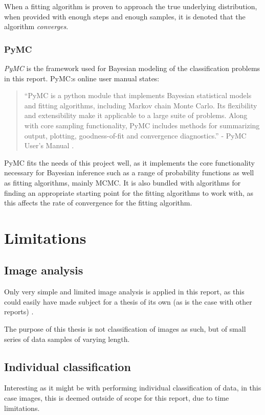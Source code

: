 When a fitting algorithm is proven to approach the true underlying 
distribution, when provided with enough steps and enough samples, it is 
denoted that the algorithm \emph{converges}. 

\subsubsection{PyMC}
\emph{PyMC} is the framework used for Bayesian modeling of the
classification problems in this report. PyMC:s online user manual
states:

\blockquote{
    ``PyMC is a python module that implements Bayesian statistical 
    models and fitting algorithms, including Markov chain Monte Carlo. 
    Its flexibility and extensibility make it applicable to a large 
    suite of problems. Along with core sampling functionality, 
    PyMC includes methods for summarizing output, plotting, 
    goodness-of-fit and convergence diagnostics.''
    - PyMC User's Manual \cite{pymc}.}

PyMC fits the needs of this project well, as it implements the
core functionality necessary for Bayesian inference such as a range
of probability functions as well as fitting algorithms, mainly MCMC.
It is also 
bundled with algorithms for finding an appropriate starting point for
the fitting algorithms to work with, as this affects the rate of 
convergence for the fitting algorithm.

\section{Limitations}

\subsection{Image analysis}
Only very simple and limited image analysis is applied in this 
report, as this could easily have made subject for a thesis of 
its own (as is the case with other reports) 
\cite{content-based-classification, framework-classification}. 

The purpose of this thesis is not classification of images as
such, but of small series of data samples of varying length. 

\subsection{Individual classification}
Interesting as it might be with performing individual 
classification of data, in this case images, this is deemed
outside of scope for this report, due to time limitations. 

